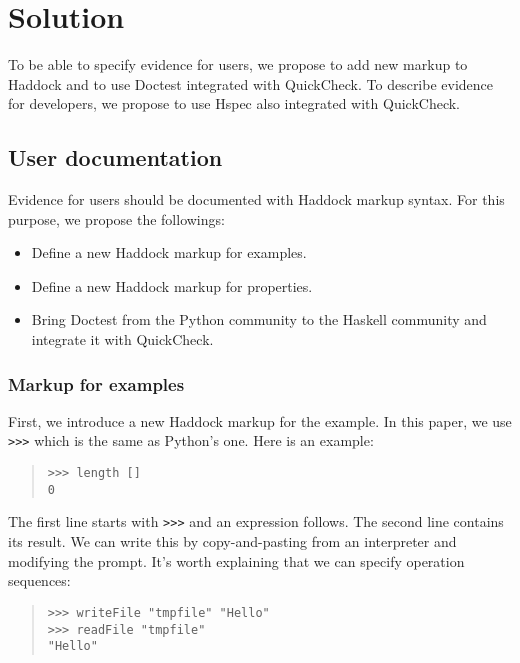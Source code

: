 \documentclass[preprint]{sigplanconf}
\begin{document}
\section{Solution}

To be able to specify evidence for users, we propose to add new
markup to Haddock and to use Doctest integrated with QuickCheck. To
describe evidence for developers, we propose to use Hspec also
integrated with QuickCheck.

\subsection{User documentation}
\label{sec:user-doc}

Evidence for users should be documented with Haddock markup syntax.
For this purpose, we propose the followings:

\begin{itemize}
\item Define a new Haddock markup for examples.
\item Define a new Haddock markup for properties.
\item Bring Doctest from the Python community to the Haskell
community and integrate it with QuickCheck.
\end{itemize}

\subsubsection{Markup for examples}

\noindent First, we introduce a new Haddock markup for the example.
In this paper, we use {\tt >>>} which is the same as Python's one.
Here is an example:

\begin{quote}
\small
\begin{verbatim}
>>> length []
0
\end{verbatim}
\end{quote}

\noindent The first line starts with {\tt >>>} and an expression follows. The second line contains its result. We can write this by copy-and-pasting from an interpreter and modifying the prompt.
It's worth explaining that we can specify operation sequences:

\begin{quote}
\small
\begin{verbatim}
>>> writeFile "tmpfile" "Hello"
>>> readFile "tmpfile"
"Hello"
\end{verbatim}
\end{quote}
\end{document}
